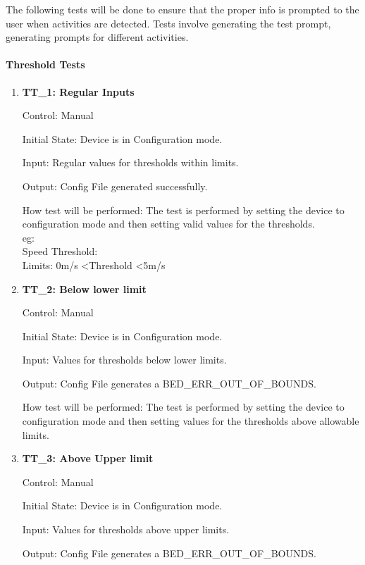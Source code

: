 \documentclass[12pt, titlepage]{article}
\begin{document}
The following tests will be done to ensure that the proper info is prompted to the user when activities are detected. Tests involve generating the test prompt, generating prompts for different activities.
		
\paragraph{Threshold Tests}
\begin{enumerate}
	\item{\textbf{TT\_1: Regular Inputs} \\}\label{TT1}
	
		Control: Manual 
							
		Initial State: Device is in Configuration mode.
							
		Input: Regular values for thresholds within limits.
		
		Output: Config File generated successfully.
		
		How test will be performed: The test is performed by setting the device to configuration mode and then setting valid values for the thresholds.\\
		eg: \\
		Speed Threshold:\\
		Limits: 0m/s \textless Threshold \textless 5m/s

	\item{\textbf{TT\_2: Below lower limit} \\}\label{TT2}
	
		Control: Manual 
							
		Initial State: Device is in Configuration mode.
							
		Input: Values for thresholds below lower limits.
		
		Output: Config File generates a BED\_ERR\_OUT\_OF\_BOUNDS.

		How test will be performed: The test is performed by setting the device to configuration mode and then setting values for the thresholds above allowable limits.

	\item{\textbf{TT\_3: Above Upper limit }\\}\label{TT3}
	
		Control: Manual 
							
		Initial State: Device is in Configuration mode.
							
		Input: Values for thresholds above upper limits.
		
		Output: Config File generates a BED\_ERR\_OUT\_OF\_BOUNDS.
		

\end{enumerate}
\end{document}
